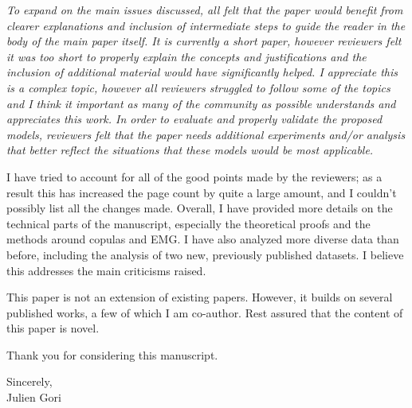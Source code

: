 \documentclass{article}
\begin{document}
\textit{To expand on the main issues discussed, all felt that the paper would benefit from clearer explanations and inclusion of intermediate steps to guide the reader in the body of the main paper itself. It is currently a short paper, however reviewers felt it was too short to properly explain the concepts and justifications and the inclusion of additional material would have significantly helped. I appreciate this is a complex topic, however all reviewers struggled to follow some of the topics and I think it important as many of the community as possible understands and appreciates this work. In order to evaluate and properly validate the proposed models, reviewers felt that the paper needs additional experiments and/or analysis that better reflect the situations that these models would be most applicable.}

I have tried to account for all of the good points made by the reviewers; as a result this has increased the page count by quite a large amount, and I couldn't possibly list all the changes made. Overall, I have provided more details on the technical parts of the manuscript, especially the theoretical proofs and the methods around copulas and EMG. I have also analyzed more diverse data than before, including the analysis of two new, previously published datasets. I believe this addresses the main criticisms raised.

This paper is not an extension of existing papers. However, it builds on several published works, a few of which I am co-author. Rest assured that the content of this paper is novel.


Thank you for considering this manuscript. \\
\begin{flushright}
Sincerely,\\
Julien Gori
\end{flushright}
\end{document}
